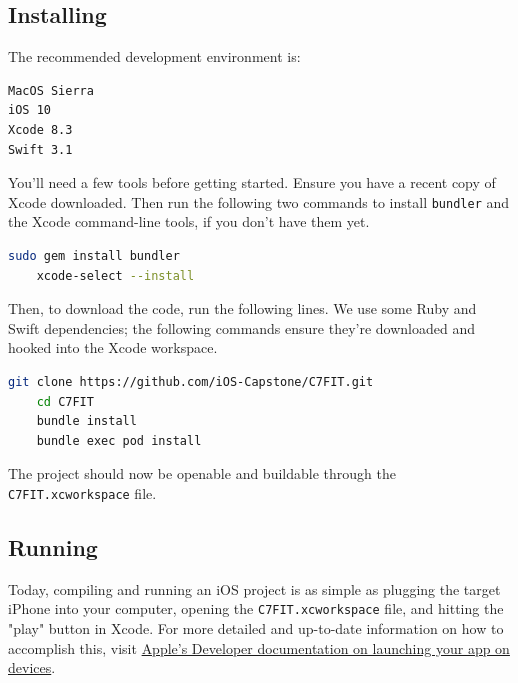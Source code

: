 \subsection{Installing}
The recommended development environment is:

\begin{verbatim}
MacOS Sierra
iOS 10
Xcode 8.3
Swift 3.1
\end{verbatim}

You'll need a few tools before getting started. Ensure you have a recent
copy of Xcode downloaded. Then run the following two commands to install
\texttt{bundler} and the Xcode command-line tools, if you don't have
them yet.

\begin{lstlisting}[language=Bash]
    sudo gem install bundler
    xcode-select --install
\end{lstlisting}

Then, to download the code, run the following lines. We use some Ruby
and Swift dependencies; the following commands ensure they're downloaded
and hooked into the Xcode workspace.

\begin{lstlisting}[language=Bash]
    git clone https://github.com/iOS-Capstone/C7FIT.git
    cd C7FIT
    bundle install
    bundle exec pod install
\end{lstlisting}

The project should now be openable and buildable through the
\texttt{C7FIT.xcworkspace} file.

\subsection{Running}
Today, compiling and running an iOS project is as simple as plugging the target iPhone into your computer, opening the \texttt{C7FIT.xcworkspace} file, and hitting the "play" button in Xcode. For more detailed and up-to-date information on how to accomplish this, visit
\href{https://developer.apple.com/library/content/documentation/IDEs/Conceptual/AppDistributionGuide/LaunchingYourApponDevices/LaunchingYourApponDevices.html
}{Apple's Developer documentation on launching your app on devices}.

